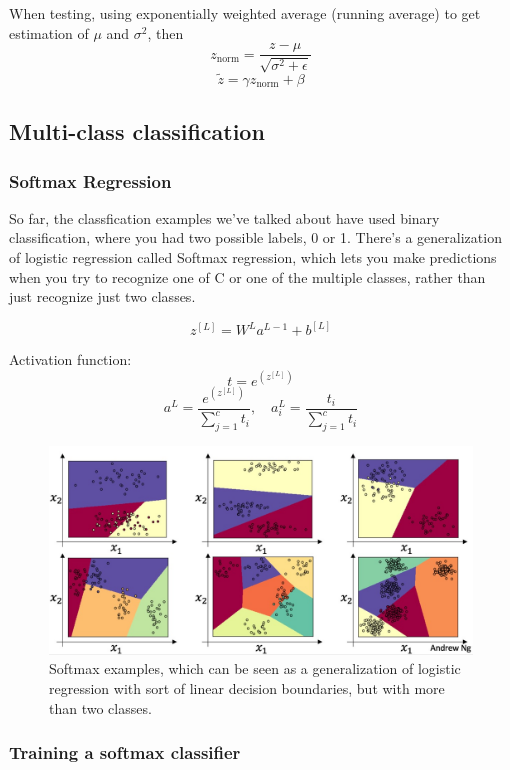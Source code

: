 \documentclass[UTF8]{article}
\newcommand{\Vector}[1]{\boldsymbol{\mathit{#1}}}   %
\newcommand{\Matrix}[1]{\boldsymbol{\mathit{#1}}}   %
\begin{document}
When testing, using exponentially weighted average (running average) to get estimation of $\mu$ and
$\sigma^2$, then
$$\displaystyle z_{\text{norm}} = \frac{z-\mu}{\sqrt{\sigma^2 + \epsilon}}$$
$$\displaystyle \widetilde{z} = \gamma z_{\text{norm}} + \beta$$

\subsection{Multi-class classification}
\subsubsection{Softmax Regression}
So far, the classfication examples we've talked about have used binary classification, where you
had two possible labels, 0 or 1. There's a generalization of logistic regression called Softmax
regression, which lets you make predictions when you try to recognize one of C or one of the
multiple classes, rather than just recognize just two classes.

$$ \Vector{z^{[L]}} = \Matrix{W^{L}} \Vector{a^{L-1}} + \Vector{b^{[L]}} $$

Activation function:
$$ t = e^{(\Vector{z^{[L]}})} $$
$$ \Vector{a^{L}} = \frac{e^{(\Vector{z^{[L]}})}}{\sum_{j=1}^c t_i}, \quad
\Vector{a_i^{L}} = \frac{t_i}{\sum_{j=1}^c t_i} $$

\begin{figure}[htb]
    \centering
    \includegraphics[width=40em]{figures/softmax-examples}
    \caption{Softmax examples, which can be seen as a generalization of logistic regression with
    sort of linear decision boundaries, but with more than two classes.}
    \label{fig:softmax-examples}
\end{figure}

\subsubsection{Training a softmax classifier}
\end{document}
